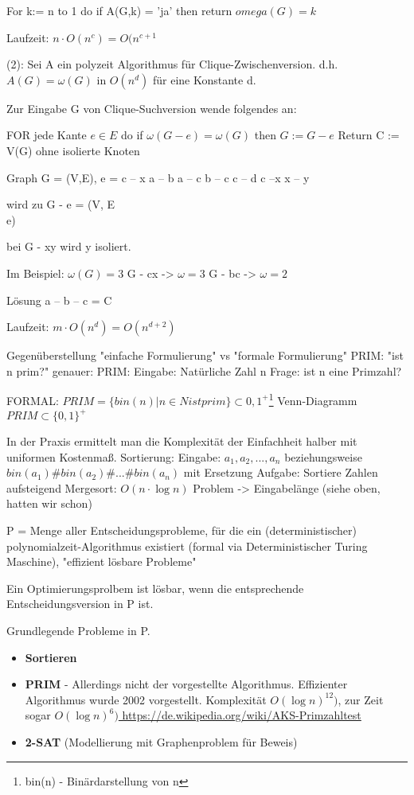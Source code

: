 \documentclass{article} %
\begin{document}
\begin{framed}
For k:= n to 1 do
	if A(G,k) = 'ja'
	then return $omega (G) = k $
\end{framed}
Laufzeit: $n \cdot O(n^c) = O(n^{c+1}$


(2): Sei A ein polyzeit Algorithmus für Clique-Zwischenversion.
d.h. $A(G) = \omega (G)$ in $O(n^d)$ für eine Konstante d.

Zur Eingabe G von Clique-Suchversion wende folgendes an:
\begin{framed}
FOR jede Kante $e \in E$ do
	if $\omega (G - e ) = \omega (G)$
	then $G := G - e$
Return C := V(G) ohne isolierte Knoten
\end{framed}

Graph G = (V,E), e = c -- x %
a -- b
a -- c
b -- c
c -- d
c --x %
x -- y

wird zu G - e = (V, E \\ {e}) %

bei G - xy wird y isoliert. %

Im Beispiel: $\omega (G) = 3$
G - cx -> $\omega = 3$
G - bc -> $\omega = 2$ %


Lösung a -- b -- c = C

Laufzeit: $m \cdot O(n^d) = O(n^{d+2})$

Gegenüberstellung "einfache Formulierung" vs "formale Formulierung"
PRIM: "ist n prim?"
genauer: 
PRIM:
Eingabe: Natürliche Zahl n
Frage: ist n eine Primzahl?

FORMAL: $PRIM = \{ bin(n) |  n \in N ist prim\} \subset {0,1}^+$\footnote{bin(n) - Binärdarstellung von n}
Venn-Diagramm $PRIM \subset \{0,1\}^+$

In der Praxis ermittelt man die Komplexität der Einfachheit halber mit uniformen Kostenmaß.
Sortierung:
Eingabe: $a_1, a_2,...,a_n$ beziehungsweise $bin(a_1) \# bin(a_2) \# ... \# bin(a_n) $ mit Ersetzung 
Aufgabe: Sortiere Zahlen aufsteigend
Mergesort: $O(n \cdot \log n)$
Problem -> Eingabelänge (siehe oben, hatten wir schon)


P = Menge aller Entscheidungsprobleme, für die ein (deterministischer) polynomialzeit-Algorithmus existiert (formal via Deterministischer Turing Maschine), "effizient lösbare Probleme"

Ein Optimierungsprolbem ist lösbar, wenn die entsprechende Entscheidungsversion in P ist.

Grundlegende Probleme in P.
\begin{itemize}
\item\textbf{Sortieren}
\item\textbf{PRIM} - Allerdings nicht der vorgestellte Algorithmus. Effizienter Algorithmus wurde 2002 vorgestellt. Komplexität $O(\log n)^{12})$, zur Zeit sogar $O(\log n)^{6})$\url{ https://de.wikipedia.org/wiki/AKS-Primzahltest}
\item\textbf{2-SAT}  (Modellierung mit Graphenproblem für Beweis)
\end{itemize}



\end{document}
